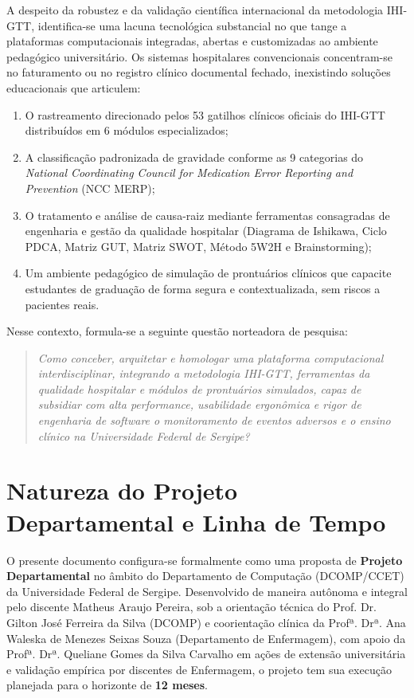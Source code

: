 A despeito da robustez e da validação científica internacional da metodologia IHI-GTT, identifica-se uma lacuna tecnológica substancial no que tange a plataformas computacionais integradas, abertas e customizadas ao ambiente pedagógico universitário. Os sistemas hospitalares convencionais concentram-se no faturamento ou no registro clínico documental fechado, inexistindo soluções educacionais que articulem:
\begin{enumerate}
    \item O rastreamento direcionado pelos 53 gatilhos clínicos oficiais do IHI-GTT distribuídos em 6 módulos especializados;
    \item A classificação padronizada de gravidade conforme as 9 categorias do \textit{National Coordinating Council for Medication Error Reporting and Prevention} (NCC MERP);
    \item O tratamento e análise de causa-raiz mediante ferramentas consagradas de engenharia e gestão da qualidade hospitalar (Diagrama de Ishikawa, Ciclo PDCA, Matriz GUT, Matriz SWOT, Método 5W2H e Brainstorming);
    \item Um ambiente pedagógico de simulação de prontuários clínicos que capacite estudantes de graduação de forma segura e contextualizada, sem riscos a pacientes reais.
\end{enumerate}

Nesse contexto, formula-se a seguinte questão norteadora de pesquisa:

\begin{quote}
\textit{Como conceber, arquitetar e homologar uma plataforma computacional interdisciplinar, integrando a metodologia IHI-GTT, ferramentas da qualidade hospitalar e módulos de prontuários simulados, capaz de subsidiar com alta performance, usabilidade ergonômica e rigor de engenharia de software o monitoramento de eventos adversos e o ensino clínico na Universidade Federal de Sergipe?}
\end{quote}

\section{Natureza do Projeto Departamental e Linha de Tempo}
\label{sec:natureza-projeto}

O presente documento configura-se formalmente como uma proposta de \textbf{Projeto Departamental} no âmbito do Departamento de Computação (DCOMP/CCET) da Universidade Federal de Sergipe. Desenvolvido de maneira autônoma e integral pelo discente Matheus Araujo Pereira, sob a orientação técnica do Prof. Dr. Gilton José Ferreira da Silva (DCOMP) e coorientação clínica da Profª. Drª. Ana Waleska de Menezes Seixas Souza (Departamento de Enfermagem), com apoio da Profª. Drª. Queliane Gomes da Silva Carvalho em ações de extensão universitária e validação empírica por discentes de Enfermagem, o projeto tem sua execução planejada para o horizonte de \textbf{12 meses}.

